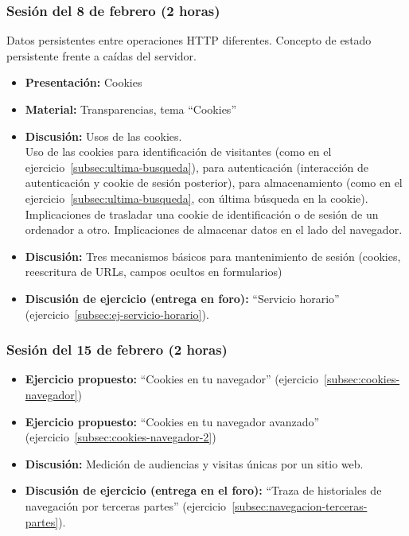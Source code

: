 \documentclass[a4paper,12pt]{article}
\begin{document}
\subsubsection{Sesión del 8 de febrero (2 horas)}

Datos persistentes entre operaciones HTTP diferentes. Concepto de estado persistente frente a caídas del servidor.

\begin{itemize}
\item \textbf{Presentación:} Cookies
\item \textbf{Material:} Transparencias, tema ``Cookies''
\item \textbf{Discusión:} Usos de las cookies. \\
  Uso de las cookies para identificación de visitantes (como en el ejercicio~\ref{subsec:ultima-busqueda}), para autenticación (interacción de autenticación y cookie de sesión posterior), para almacenamiento (como en el ejercicio~\ref{subsec:ultima-busqueda}, con última búsqueda en la cookie). Implicaciones de trasladar una cookie de identificación o de sesión de un ordenador a otro. Implicaciones de almacenar datos en el lado del navegador.
\item \textbf{Discusión:} Tres mecanismos básicos para mantenimiento de sesión (cookies, reescritura de URLs, campos ocultos en formularios)
\item \textbf{Discusión de ejercicio (entrega en foro):} ``Servicio horario'' \\
  (ejercicio~\ref{subsec:ej-servicio-horario}).
\end{itemize}

\subsubsection{Sesión del 15 de febrero (2 horas)}

\begin{itemize}
\item \textbf{Ejercicio propuesto:} ``Cookies en tu navegador'' (ejercicio~\ref{subsec:cookies-navegador}) \\
\item \textbf{Ejercicio propuesto:} ``Cookies en tu navegador avanzado'' (ejercicio~\ref{subsec:cookies-navegador-2}) \\
\item \textbf{Discusión:} Medición de audiencias y visitas únicas por un sitio web.
\item \textbf{Discusión de ejercicio (entrega en el foro):} ``Traza de historiales de navegación por terceras partes'' (ejercicio~\ref{subsec:navegacion-terceras-partes}).
\end{itemize}
\end{document}
